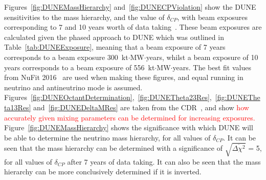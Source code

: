 Figures~\ref{fig:DUNEMassHierarchy} and~\ref{fig:DUNECPViolation} show the DUNE sensitivities to the mass hierarchy, and the value of $\delta_{CP}$, with beam exposures corresponding to 7 and 10 years worth of data taking~\citep{Elizabeth_01_17}. These beam exposures are calculated given the phased approach to DUNE which was outlined in Table~\ref{tab:DUNEExposure}, meaning that a beam exposure of 7 years corresponds to a beam exposure 300~kt$\cdot$MW$\cdot$years, whilst a beam exposure of 10 years corresponds to a beam exposure of 556~kt$\cdot$MW$\cdot$years. The best fit values from NuFit 2016~\citep{NuFit2016} are used when making these figures, and equal running in neutrino and antineutrino mode is assumed. Figures~\ref{fig:DUNEOctantDetermination},~\ref{fig:DUNETheta23Res},~\ref{fig:DUNETheta13Res} and~\ref{fig:DUNEDeltaMRes} are taken from the CDR~\citep{DUNECDR_V2}, and show \textcolor{red}{how accurately given mixing parameters can be determined for increasing exposures.} \\

Figure~\ref{fig:DUNEMassHierarchy} shows the significance with which DUNE will be able to determine the neutrino mass hierarchy, for all values of $\delta_{CP}$. It can be seen that the mass hierarchy can be determined with a significance of $\sqrt{\overline{\Delta{\chi^2}}}$ = 5, for all values of $\delta_{CP}$ after 7 years of data taking. It can also be seen that the mass hierarchy can be more conclusively determined if it is inverted. \\

